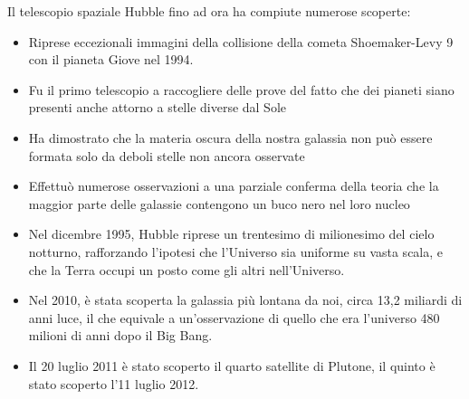 \documentclass[12pt,a4paper]{article}
\begin{document}
Il telescopio spaziale Hubble fino ad ora ha compiute numerose scoperte:

\begin{itemize}
\item Riprese eccezionali immagini della collisione della cometa Shoemaker-Levy 9 con il pianeta Giove nel 1994.

\item Fu il primo telescopio a raccogliere delle prove del fatto che dei pianeti siano presenti anche attorno a stelle diverse dal Sole

\item Ha dimostrato che la materia oscura della nostra galassia non può essere formata solo da deboli stelle non ancora osservate

\item Effettuò numerose osservazioni a una parziale conferma della teoria che la maggior parte delle galassie contengono un buco nero nel loro nucleo

\item Nel dicembre 1995, Hubble riprese un trentesimo di milionesimo del cielo notturno, rafforzando l'ipotesi che l'Universo sia uniforme su vasta scala, e che la Terra occupi un posto come gli altri nell'Universo.

\item Nel 2010, è stata scoperta la galassia più lontana da noi, circa 13,2 miliardi di anni luce, il che equivale a un'osservazione di quello che era l'universo 480 milioni di anni dopo il Big Bang.

\item Il 20 luglio 2011 è stato scoperto il quarto satellite di Plutone, il quinto è stato scoperto l'11 luglio 2012.

\end{itemize}
\end{document}

